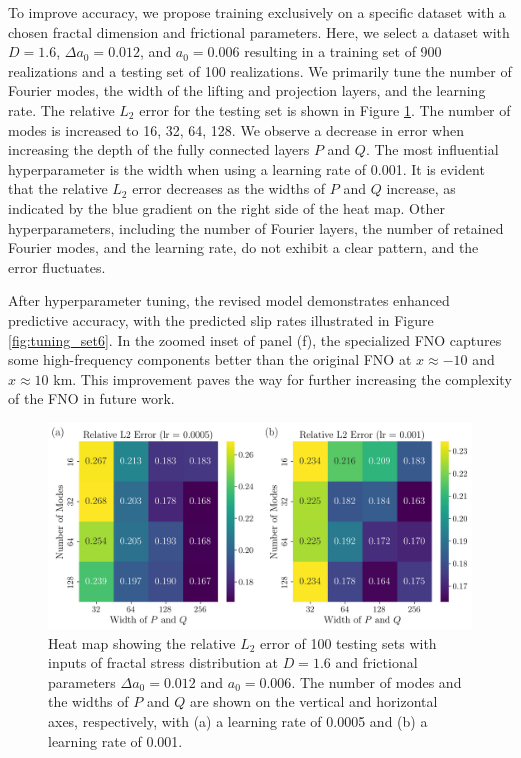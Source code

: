 \documentclass[draft]{agujournal2019}
\begin{document}
To improve accuracy, we propose training exclusively on a specific dataset with a chosen fractal dimension and frictional parameters. Here, we select a dataset with \(D=1.6\), \(\Delta a_0 = 0.012\), and \(a_0 = 0.006\) resulting in a training set of 900 realizations and a testing set of 100 realizations. We primarily tune the number of Fourier modes, the width of the lifting and projection layers, and the learning rate. The relative \(L_2\) error for the testing set is shown in Figure \ref{fig:heatmap}. The number of modes is increased to 16, 32, 64, 128. We observe a decrease in error when increasing the depth of the fully connected layers \(P\) and \(Q\).  The most influential hyperparameter is the width when using a learning rate of 0.001. It is evident that the relative \(L_2\) error decreases as the widths of \(P\) and \(Q\) increase, as indicated by the blue gradient on the right side of the heat map. Other hyperparameters, including the number of Fourier layers, the number of retained Fourier modes, and the learning rate, do not exhibit a clear pattern, and the error fluctuates. 

After hyperparameter tuning, the revised model demonstrates enhanced predictive accuracy, with the predicted slip rates illustrated in Figure \ref{fig:tuning_set6}. In the zoomed inset of panel (f), the specialized FNO captures some high-frequency components better than the original FNO at \( x \approx -10 \) and \(x \approx 10\) km. This improvement paves the way for further increasing the complexity of the FNO in future work.

\begin{figure}
    \centering
    \includegraphics[width=0.8\linewidth]{heatmap.png}
    \caption{\label{fig:heatmap}Heat map showing the relative \(L_2\) error of 100 testing sets with inputs of fractal stress distribution at \(D=1.6\) and frictional parameters \(\Delta a_{0}=0.012\) and \(a_{0}=0.006\). The number of modes and the widths of \(P\) and \(Q\) are shown on the vertical and horizontal axes, respectively, with (a) a learning rate of 0.0005 and (b) a learning rate of 0.001.}
\end{figure}
\end{document}
